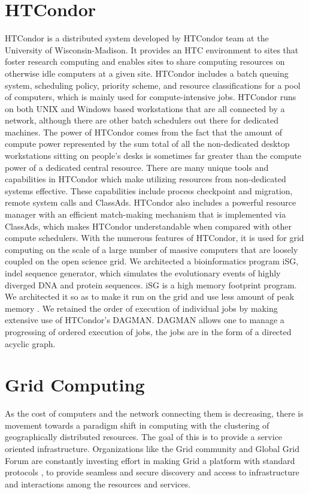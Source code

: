\documentclass[ms,electronic,double]{nuthesis}
\begin{document}
\section{HTCondor} HTCondor is a distributed system developed by HTCondor team at the 
University of Wisconsin-Madison. It provides an HTC environment to sites 
that foster research computing and enables sites to share computing resources on otherwise  
idle computers at a given site. HTCondor includes a batch queuing 
system, scheduling policy, priority scheme, and resource classifications for a pool of 
computers, which is mainly used for compute-intensive jobs. HTCondor runs on both
 UNIX and Windows based workstations that are all connected by a network, although there are other batch schedulers out there for dedicated machines. 
The power of HTCondor comes from  the fact that  the amount of compute power 
represented by the sum total of all the 
 non-dedicated desktop workstations sitting on people's desks is sometimes far 
 greater than the compute power of a dedicated central resource. There are many 
 unique tools and capabilities in HTCondor which make utilizing resources from 
 non-dedicated systems effective. These capabilities include process checkpoint 
 and migration, remote system calls and ClassAds. HTCondor also includes a 
 powerful resource manager with an efficient match-making mechanism that is 
 implemented via ClassAds, which makes HTCondor understandable when compared with other 
 compute schedulers\cite{manual56}. With the numerous features of HTCondor, it is 
 used for grid computing on the scale of a large number of massive computers 
 that are loosely coupled on the open science grid. We architected a 
 bioinformatics program iSG, indel sequence generator, which simulates the evolutionary events of highly diverged DNA and protein 
 sequences. iSG is a high memory footprint program. We architected it so as to 
 make it run on the grid and use less amount of peak memory \cite{condorisg_paper}. 
 We retained the order of execution of individual jobs 
 by making extensive use of HTCondor's DAGMAN. DAGMAN allows one to manage a 
 progressing of ordered execution of jobs, the jobs are in the form of a 
 directed acyclic graph.
 
 
\section{Grid Computing}

As the cost of computers and the network connecting them is decreasing, there is movement towards a 
paradigm shift in computing with the clustering of geographically distributed 
resources. The goal of this is to provide a 
service oriented infrastructure. Organizations like the Grid community and Global Grid Forum are constantly investing effort in making Grid a platform with standard 
protocols \cite{Foster:2001:AGE:1080644.1080667}, to provide seamless and secure discovery and access to infrastructure and interactions among
 the resources and services.
 
\end{document}

